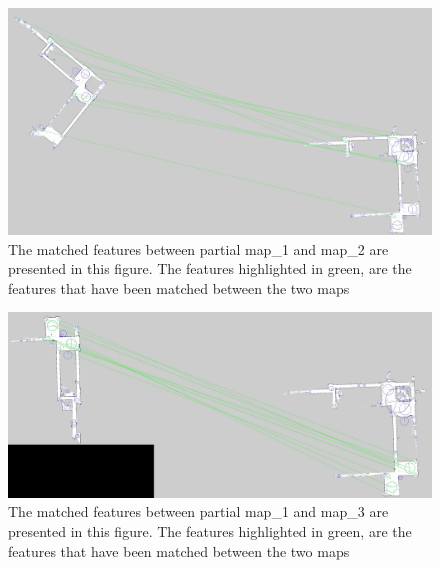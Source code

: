 \begin{figure}[H]
    \centering
    \includegraphics[width=1\textwidth]{figs/real_world_results/a/matchesPartialMap1Map2.jpg}
    \caption{The matched features between partial map\_1 and map\_2 are presented in this figure. The features highlighted in green, are the features that have been matched between the two maps}
    \label{fig:real3matches1}
\end{figure} 


\begin{figure}[H]
    \centering
    \includegraphics[width=1\textwidth]{figs/real_world_results/a/matchesPartialMap1Map3.jpg}
    \caption{The matched features between partial map\_1 and map\_3 are presented in this figure. The features highlighted in green, are the features that have been matched between the two maps}
    \label{fig:real3matches2}
\end{figure} 

